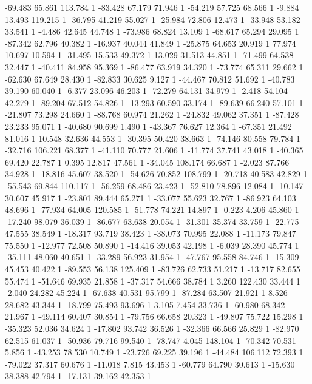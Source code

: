 	-69.483 65.861 113.784 1
	-83.428 67.179 71.946 1
	-54.219 57.725 68.566 1
	-9.884 13.493 119.215 1
	-36.795 41.219 55.027 1
	-25.984 72.806 12.473 1
	-33.948 53.182 33.541 1
	-4.486 42.645 44.748 1
	-73.986 68.824 13.109 1
	-68.617 65.294 29.095 1
	-87.342 62.796 40.382 1
	-16.937 40.044 41.849 1
	-25.875 64.653 20.919 1
	77.974 10.697 10.594 1
	-31.495 15.533 49.372 1
	13.029 31.513 44.851 1
	-71.499 64.538 32.447 1
	-40.411 84.958 95.369 1
	-86.477 63.919 34.320 1
	-73.774 65.311 29.662 1
	-62.630 67.649 28.430 1
	-82.833 30.625 9.127 1
	-44.467 70.812 51.692 1
	-40.783 39.190 60.040 1
	-6.377 23.096 46.203 1
	-72.279 64.131 34.979 1
	-2.418 54.104 42.279 1
	-89.204 67.512 54.826 1
	-13.293 60.590 33.174 1
	-89.639 66.240 57.101 1
	-21.807 73.298 24.660 1
	-88.768 60.974 21.262 1
	-24.832 49.062 37.351 1
	-87.428 23.233 95.071 1
	-40.680 90.699 1.490 1
	-43.367 76.627 12.364 1
	-67.351 21.492 81.016 1
	10.548 32.636 44.553 1
	-30.395 50.420 38.663 1
	-74.146 80.558 79.784 1
	-32.716 106.221 68.377 1
	-41.110 70.777 21.606 1
	-11.774 37.741 43.018 1
	-40.365 69.420 22.787 1
	0.395 12.817 47.561 1
	-34.045 108.174 66.687 1
	-2.023 87.766 34.928 1
	-18.816 45.607 38.520 1
	-54.626 70.852 108.799 1
	-20.718 40.583 42.829 1
	-55.543 69.844 110.117 1
	-56.259 68.486 23.423 1
	-52.810 78.896 12.084 1
	-10.147 30.607 45.917 1
	-23.801 89.444 65.271 1
	-33.077 55.623 32.767 1
	-86.923 64.103 48.696 1
	-77.934 64.005 120.585 1
	-51.778 74.221 14.897 1
	-0.223 4.206 45.860 1
	-17.240 98.079 36.039 1
	-86.677 63.638 20.054 1
	-31.301 35.374 33.759 1
	-22.775 47.555 38.549 1
	-18.317 93.719 38.423 1
	-38.073 70.995 22.088 1
	-11.173 79.847 75.550 1
	-12.977 72.508 50.890 1
	-14.416 39.053 42.198 1
	-6.039 28.390 45.774 1
	-35.111 48.060 40.651 1
	-33.289 56.923 31.954 1
	-47.767 95.558 84.746 1
	-15.309 45.453 40.422 1
	-89.553 56.138 125.409 1
	-83.726 62.733 51.217 1
	-13.717 82.655 55.474 1
	-51.646 69.935 21.858 1
	-37.317 54.666 38.784 1
	3.260 122.430 33.444 1
	-2.040 24.282 45.224 1
	-67.638 40.531 95.799 1
	-87.284 63.507 21.921 1
	8.526 28.682 43.344 1
	-18.799 75.493 93.696 1
	3.105 7.454 33.736 1
	-60.980 68.342 21.967 1
	-49.114 60.407 30.854 1
	-79.756 66.658 20.323 1
	-49.807 75.722 15.298 1
	-35.323 52.036 34.624 1
	-17.802 93.742 36.526 1
	-32.366 66.566 25.829 1
	-82.970 62.515 61.037 1
	-50.936 79.716 99.540 1
	-78.747 4.045 148.104 1
	-70.342 70.531 5.856 1
	-43.253 78.530 10.749 1
	-23.726 69.225 39.196 1
	-44.484 106.112 72.393 1
	-79.022 37.317 60.676 1
	-11.018 7.815 43.453 1
	-60.779 64.790 30.613 1
	-15.630 38.388 42.794 1
	-17.131 39.162 42.353 1
